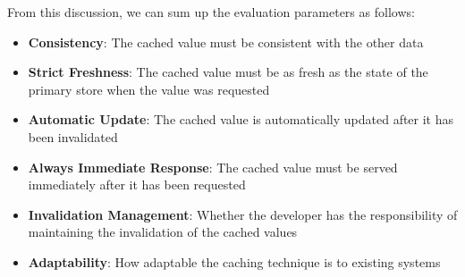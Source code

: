 From this discussion, we can sum up the evaluation parameters as follows:

\begin{itemize}
  \item \textbf{Consistency}: The cached value must be consistent with the other data
  \item \textbf{Strict Freshness}: The cached value must be as fresh as the state of the primary store when the value was requested
  \item \textbf{Automatic Update}: The cached value is automatically updated after it has been invalidated
  \item \textbf{Always Immediate Response}: The cached value must be served immediately after it has been requested
  \item \textbf{Invalidation Management}: Whether the developer has the responsibility of maintaining the invalidation of the cached values
  \item \textbf{Adaptability}: How adaptable the caching technique is to existing systems
\end{itemize}


